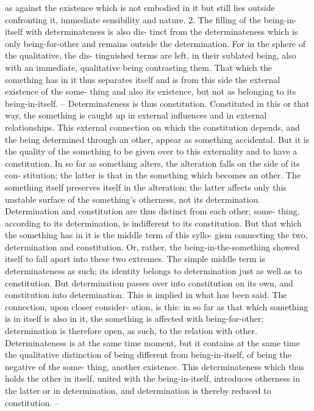 as against the existence which is not embodied in it but still lies outside
confronting it, immediate sensibility and nature.
2. The filling of the being-in-itself with determinateness is also dis-
tinct from the determinateness which is only being-for-other and remains
outside the determination. For in the sphere of the qualitative, the dis-
tinguished terms are left, in their sublated being, also with an immediate,
qualitative being contrasting them. That which the something has in it
thus separates itself and is from this side the external existence of the some-
thing and also its existence, but not as belonging to its being-in-itself. –
Determinateness is thus constitution.
Constituted in this or that way, the something is caught up in external
influences and in external relationships. This external connection on which
the constitution depends, and the being determined through an other,
appear as something accidental. But it is the quality of the something to
be given over to this externality and to have a constitution.
In so far as something alters, the alteration falls on the side of its con-
stitution; the latter is that in the something which becomes an other. The
something itself preserves itself in the alteration; the latter affects only this
unstable surface of the something’s otherness, not its determination.
Determination and constitution are thus distinct from each other; some-
thing, according to its determination, is indifferent to its constitution.
But that which the something has in it is the middle term of this syllo-
gism connecting the two, determination and constitution. Or, rather, the
being-in-the-something showed itself to fall apart into these two extremes.
The simple middle term is determinateness as such; its identity belongs to
determination just as well as to constitution. But determination passes over
into constitution on its own, and constitution into determination. This
is implied in what has been said. The connection, upon closer consider-
ation, is this: in so far as that which something is in itself is also in it,
the something is affected with being-for-other; determination is therefore
open, as such, to the relation with other. Determinateness is at the same
time moment, but it contains at the same time the qualitative distinction
of being different from being-in-itself, of being the negative of the some-
thing, another existence. This determinateness which thus holds the other
in itself, united with the being-in-itself, introduces otherness in the latter or
in determination, and determination is thereby reduced to constitution. –

